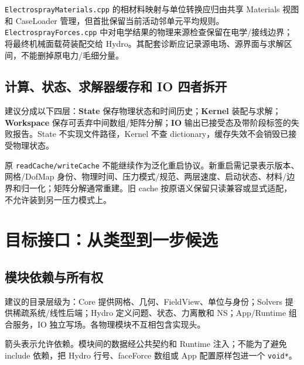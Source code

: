 \documentclass[UTF8,a4paper,11pt,fontset=fandol]{ctexart}
\newcommand{\code}[1]{\nolinkurl{#1}}
\begin{document}
\code{ElectrosprayMaterials.cpp} 的相材料映射与单位转换应归由共享 Materials 视图和 CaseLoader 管理，但首批保留当前活动邻单元平均规则。\code{ElectrosprayForces.cpp} 中对电学结果的物理来源检查保留在电学/接线边界；将最终机械面载荷装配交给 Hydro。其配套诊断应记录源电场、源界面与求解区间，不能删掉原电力/毛细分量。

\subsection{计算、状态、求解器缓存和 IO 四者拆开}
建议分成以下四层：\textbf{State} 保存物理状态和时间历史；\textbf{Kernel} 装配与求解；\textbf{Workspace} 保存可丢弃中间数组/矩阵分解；\textbf{IO} 输出已接受态及带阶段标签的失败报告。State 不实现文件路径，Kernel 不查 dictionary，缓存失效不会销毁已接受物理状态。

原 \code{readCache/writeCache} 不能继续作为泛化重启协议。新重启需记录表示版本、网格/DofMap 身份、物理时间、压力模式/规范、两层速度、启动状态、材料/边界和归一化；矩阵分解通常重建。旧 cache 按原语义保留只读兼容或显式适配，不允许装到另一压力模式上。

\section{目标接口：从类型到一步候选}
\subsection{模块依赖与所有权}
建议的目录层级为：Core 提供网格、几何、FieldView、单位与身份；Solvers 提供稀疏系统/线性后端；Hydro 定义问题、状态、力离散和 NS；App/Runtime 组合服务，IO 独立写场。各物理模块不互相包含实现头。

\begin{center}
\end{center}
箭头表示允许依赖。模块间的数据经公共契约和 Runtime 注入；不能为了避免 include 依赖，把 Hydro 行号、faceForce 数组或 App 配置原样包进一个 \code{void*}。
\end{document}
